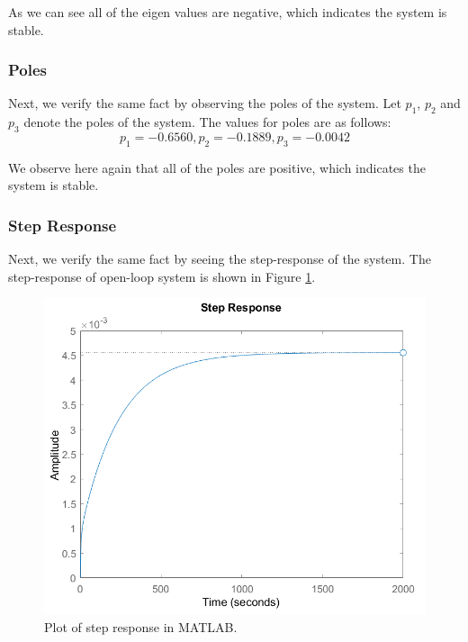 \documentclass{article}
\begin{document}
	
As we can see all of the eigen values are negative, which indicates the system is stable.

\subsubsection{Poles}
Next, we verify the same fact by observing the poles of the system. Let $p_1$, $p_2$ and $p_3$ denote the poles of the system. The values for poles are as follows:
\begin{equation} p_1 = -0.6560,  p_2 = -0.1889, p_3 = -0.0042 \end{equation}


We observe here again that all of the poles are positive, which indicates the system is stable. 

\subsubsection{Step Response}
Next, we verify the same fact by seeing the step-response of the system. The step-response of open-loop system is shown in Figure \ref{fig:stepResponse}.

\begin{figure}[h!]
	\centering
	\includegraphics[scale=0.75]{images/stepResponse.png}
	\caption{Plot of step response in MATLAB.}
	\label{fig:stepResponse}
\end{figure}
\end{document}
